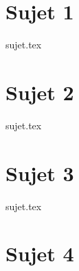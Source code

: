 \documentclass[a4paper, 11pt]{book}
\begin{document}

\chapter{Sujet 1}

\resetQ
{sujet.tex}

\chapter{Sujet 2}

\resetQ
{sujet.tex}

\chapter{Sujet 3}

\resetQ
{sujet.tex}

\chapter{Sujet 4}

\resetQ
\end{document}
